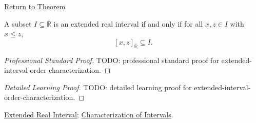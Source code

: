 \newpage
{}
\label{prf:extended-interval-order-characterization}
\begin{remark*}[Return]
\hyperref[thm:extended-interval-order-characterization]{Return to Theorem}
\end{remark*}
\begin{theorem*}
A subset $I\subseteq\overline{\mathbb{R}}$ is an extended real interval if and
only if for all $x,z\in I$ with $x\le z$,
\[
[x,z]_{\overline{\mathbb{R}}}\subseteq I.
\]
\end{theorem*}
\begin{proof}[Professional Standard Proof]
\LRAProofBodyStart
TODO: professional standard proof for extended-interval-order-characterization.
\end{proof}
\begin{proof}[Detailed Learning Proof]
\LRAProofBodyStart
TODO: detailed learning proof for extended-interval-order-characterization.
\end{proof}
\begin{remark*}
\end{remark*}
\begin{dependencies}
\hyperref[def:extended-real-interval]{Extended Real Interval};
\hyperref[thm:interval-characterization]{Characterization of Intervals}.
\end{dependencies}
\clearpage
